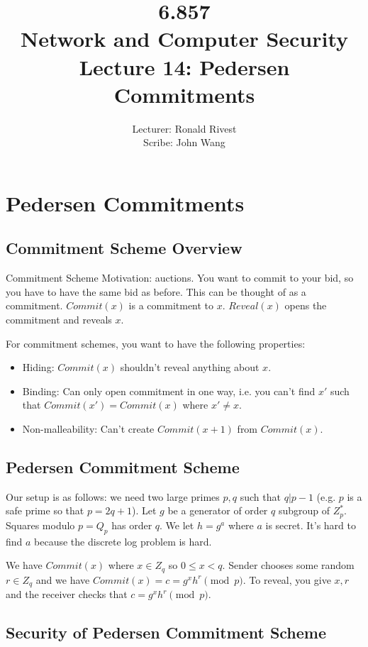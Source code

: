 \documentclass[psamsfonts]{amsart}
\title{6.857 \\
Network and Computer Security \\
Lecture 14: Pedersen Commitments}
\author{Lecturer: Ronald Rivest\\
Scribe: John Wang}
\begin{document}
\maketitle

\section{Pedersen Commitments}

\subsection{Commitment Scheme Overview}

Commitment Scheme Motivation: auctions. You want to commit to your bid, so you have to have the same bid as before. This can be thought of as a commitment. $Commit(x)$ is a commitment to $x$. $Reveal(x)$ opens the commitment and reveals $x$.

For commitment schemes, you want to have the following properties:
\begin{itemize}
  \item Hiding: $Commit(x)$ shouldn't reveal anything about $x$.
  \item Binding: Can only open commitment in one way, i.e. you can't find $x'$ such that $Commit(x') = Commit(x)$ where $x' \neq x$.
  \item Non-malleability: Can't create $Commit(x+1)$ from $Commit(x)$.
\end{itemize}

\subsection{Pedersen Commitment Scheme}

Our setup is as follows: we need two large primes $p,q$ such that $q | p-1$ (e.g. $p$ is a safe prime so that $p = 2q + 1$). Let $g$ be a generator of order $q$ subgroup of $Z_p^*$. Squares modulo $p = Q_p$ has order $q$. We let $h = g^a$ where $a$ is secret. It's hard to find $a$ because the discrete log problem is hard.

We have $Commit(x)$ where $x \in Z_q$ so $0 \leq x < q$. Sender chooses some random $r \in Z_q$ and we have $Commit(x) = c = g^x h^r \pmod{p}$. To reveal, you give $x,r$ and the receiver checks that $c = g^x h^r \pmod{p}$.

\subsection{Security of Pedersen Commitment Scheme}
\end{document}
